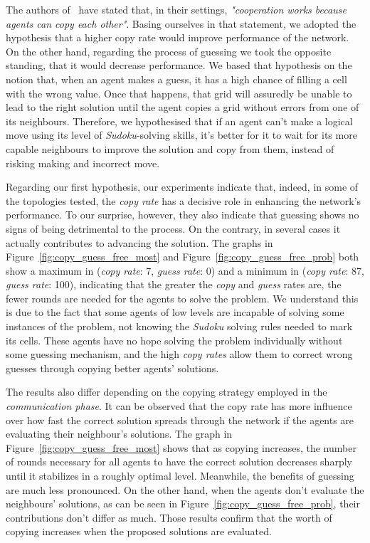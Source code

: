 \documentclass{article}
\begin{document}
The authors of~\cite{farenzena:collabem} have stated that, in their settings, {\em "cooperation works because agents can copy each other"}. Basing ourselves in that statement, we adopted the hypothesis that a higher copy rate would improve performance of the network. On the other hand, regarding the process of guessing we took the opposite standing, that it would decrease performance. We based that hypothesis on the notion that, when an agent makes a guess, it has a high chance of filling a cell with the wrong value. Once that happens, that grid will assuredly be unable to lead to the right solution until the agent copies a grid without errors from one of its neighbours. Therefore, we hypothesised that if an agent can't make a logical move using its level of \emph{Sudoku}-solving skills, it's better for it to wait for its more capable neighbours to improve the solution and copy from them, instead of risking making and incorrect move.

Regarding our first hypothesis, our experiments indicate that, indeed, in some of the topologies tested, the {\em copy rate} has a decisive role in enhancing the network's performance. To our surprise, however, they also indicate that guessing shows no signs of being detrimental to the process. On the contrary, in several cases it actually contributes to advancing the solution. The graphs in Figure~\ref{fig:copy_guess_free_most} and Figure~\ref{fig:copy_guess_free_prob} both show a maximum in ({\em copy rate}: 7, {\em guess rate}: 0) and a minimum in ({\em copy rate}: 87, {\em guess rate}: 100), indicating that the greater the {\em copy} and {\em guess} rates are, the fewer rounds are needed for the agents to solve the problem. We understand this is due to the fact that some agents of low levels are incapable of solving some instances of the problem, not knowing the {\em Sudoku} solving rules needed to mark its cells. These agents have no hope solving the problem individually without some guessing mechanism, and the high {\em copy rates} allow them to correct wrong guesses through copying better agents' solutions.

The results also differ depending on the copying strategy employed in the \emph{communication phase}. It can be observed that the copy rate has more influence over how fast the correct solution spreads through the network if the agents are evaluating their neighbour's solutions. The graph in Figure~\ref{fig:copy_guess_free_most} shows that as copying increases, the number of rounds necessary for all agents to have the correct solution decreases sharply until it stabilizes in a roughly optimal level. Meanwhile, the benefits of guessing are much less pronounced. On the other hand, when the agents don't evaluate the neighbours' solutions, as can be seen in Figure~\ref{fig:copy_guess_free_prob}, their contributions don't differ as much. Those results confirm that the worth of copying increases when the proposed solutions are evaluated.
\end{document}
